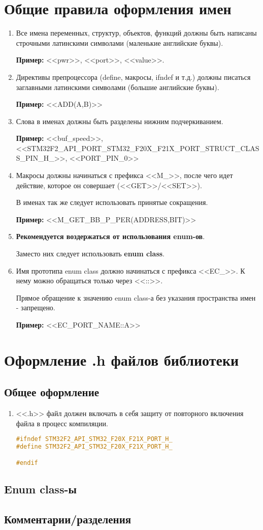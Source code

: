 \section{Общие правила оформления имен}
\label{general:rules:0}
\begin{enumerate}
	\item Все имена переменных, структур, объектов, функций должны быть написаны строчными латинскими символами (маленькие английские буквы).
	
	\textbf{Пример: }<<pwr>>, <<port>>, <<value>>.
	\item Директивы препроцессора (define, макросы, ifndef и т.д.) должны писаться заглавными латинскими символами (большие английские буквы). 
	
	\textbf{Пример: }<<ADD(A,B)>>
	\item Слова в именах должны быть разделены нижним подчеркиванием.
	
	\textbf{Пример: }<<buf\_speed>>, <<STM32F2\_\-API\_\-PORT\_\-STM32\_\-F20X\_\-F21X\_\-PORT\_\-STRUCT\_\-CLASS\_\-PIN\_\-H\_>>, <<PORT\_PIN\_0>>
	\item Макросы должны начинаться с префикса <<M\_>>, после чего идет действие, которое он совершает (<<GET>>/<<SET>>).
	
	В именах так же следует использовать принятые сокращения.
	
	\textbf{Пример: }<<M\_GET\_BB\_P\_PER(ADDRESS,BIT)>>
	\item \textbf{Рекомендуется воздержаться от использования enum-ов}.
	
	Заместо них следует использовать \textbf{enum class}.
	\item Имя прототипа enum class должно начинаться с префикса <<EC\_>>. К нему можно обращаться только через <<::>>.
	
	Прямое обращение к значению enum class-а без указания пространства имен - запрещено.
	
	\textbf{Пример: }<<EC\_PORT\_NAME::A>>
\end{enumerate}

\section{Оформление .h файлов библиотеки}
\label{file:h}
\subsection{Общее оформление}
\begin{enumerate}
	\item <<.h>> файл должен включать в себя защиту от повторного включения файла в процесс компиляции. 
	\begin{lstlisting}[language=C++, frame=tlBR]
#ifndef STM32F2_API_STM32_F20X_F21X_PORT_H_
#define STM32F2_API_STM32_F20X_F21X_PORT_H_

#endif
	\end{lstlisting}
\end{enumerate}


	

	
\subsection{Enum class-ы}
\subsection{Комментарии/разделения}
\fi